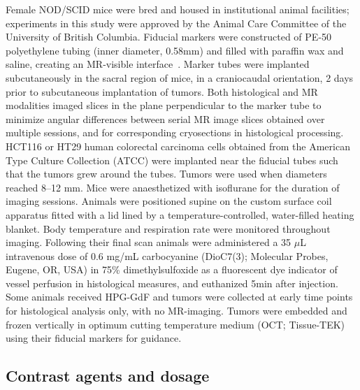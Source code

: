 Female NOD/SCID mice were bred and housed in institutional animal facilities; experiments in this study were approved by the Animal Care Committee of the University of British Columbia.
Fiducial markers were constructed of PE-50 polyethylene tubing (inner diameter, 0.58mm) and filled with paraffin wax and saline, creating an MR-visible interface~\cite{Bains:2009hh}.
Marker tubes were implanted subcutaneously in the sacral region of mice, in a craniocaudal orientation, 2 days prior to subcutaneous implantation of tumors.
Both histological and MR modalities imaged slices in the plane perpendicular to the marker tube to minimize angular differences between serial MR image slices obtained over multiple sessions, and for corresponding cryosections in histological processing.
HCT116 or HT29 human colorectal carcinoma cells obtained from the American Type Culture Collection (ATCC) were implanted near the fiducial tubes such that the tumors grew around the tubes.
Tumors were used when diameters reached 8–12 mm.
Mice were anaesthetized with isoflurane for the duration of imaging sessions.
Animals were positioned supine on the custom surface coil apparatus fitted with a lid lined by a temperature-controlled, water-filled heating blanket.
Body temperature and respiration rate were monitored throughout imaging.
Following their final scan animals were administered a 35 $\mu$L intravenous dose of 0.6 mg/mL carbocyanine (DioC7(3); Molecular Probes, Eugene, OR, USA) in 75\% dimethylsulfoxide as a fluorescent dye indicator of vessel perfusion in histological measures, and euthanized 5min after injection.
Some animals received HPG-GdF and tumors were collected at early time points for histological analysis only, with no MR-imaging.
Tumors were embedded and frozen vertically in optimum cutting temperature medium (OCT; Tissue-TEK) using their fiducial markers for guidance.

\subsection{Contrast agents and dosage}

